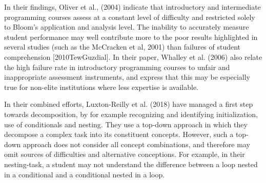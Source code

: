 In their findings, Oliver et al., (2004) indicate that introductory and intermediate programming courses assess at a constant level of difficulty and restricted solely to Bloom’s application and analysis level. The inability to accurately measure student performance may well contribute more to the poor results highlighted in several studies (such as the McCracken et al, 2001) than failures of student comprehension [2010TewGuzdial].  In their paper, Whalley et al. (2006) also relate the high failure rate in introductory programming courses to unfair and inappropriate assessment instruments, and express that this may be especially true for non-elite institutions where less expertise is available.


In their combined efforts, Luxton-Reilly et al. (2018) have managed a first step towards decomposition, by for example recognizing and identifying initialization, use of conditionals and nesting. They use a top-down approach in which they decompose a complex task into its constituent concepts. However, such a top-down approach does not consider all concept combinations, and therefore may omit sources of difficulties and alternative conceptions. For example, in their nesting-task, a student may not understand the difference between a loop nested in a conditional and a conditional nested in a loop.




